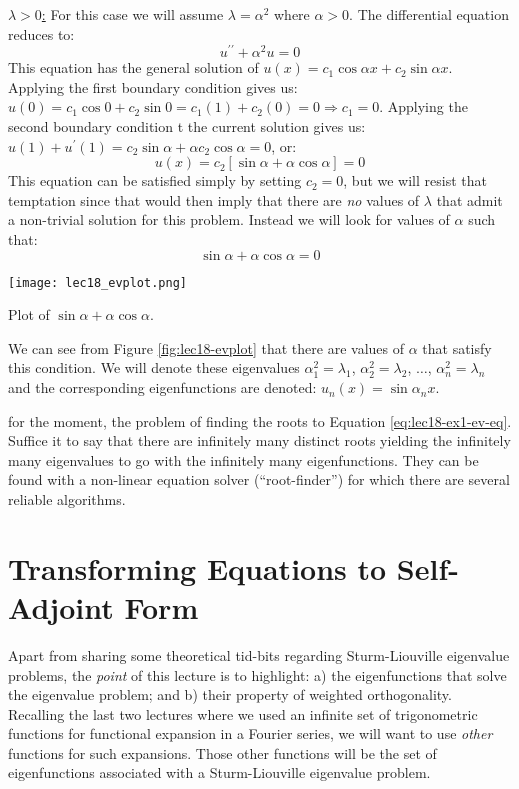 \vspace{0.5cm}

\noindent\underline{$\lambda > 0$:} For this case we will assume $\lambda = \alpha^2$ where $\alpha > 0$.  The differential equation reduces to:
\begin{equation*}
u^{\prime \prime} + \alpha^2 u = 0
\end{equation*}
This equation has the general solution of $u(x) = c_1 \cos{\alpha x} + c_2 \sin{\alpha x}$.  Applying the first boundary condition gives us: $u(0) = c_1 \cos{0} + c_2 \sin{0} = c_1(1) + c_2(0) = 0 \Rightarrow c_1 = 0$.  Applying the second boundary condition t the current solution gives us: $u(1) + u^{\prime}(1) = c_2 \sin{\alpha} + \alpha c_2 \cos{\alpha} = 0$, or:
\begin{equation}
u(x) = c_2\left[\sin{\alpha} + \alpha \cos{\alpha}\right] = 0
\label{eq:lec18-ex1}
\end{equation}
This equation can be satisfied simply by setting $c_2 = 0$, but we will resist that temptation since that would then imply that there are \emph{no} values of $\lambda$ that admit a non-trivial solution for this problem.  Instead we will look for values of $\alpha$ such that:
\begin{equation}
\sin{\alpha} + \alpha \cos{\alpha} = 0
\label{eq:lec18-ex1-ev-eq}
\end{equation}
\begin{marginfigure}
\texttt{[image: lec18\_evplot.png]}
\caption{Plot of $\sin{\alpha} + \alpha \cos{\alpha}$.}
\label{fig:lec18-evplot}
\end{marginfigure}
We can see from Figure \ref{fig:lec18-evplot} that there are values of $\alpha$ that satisfy this condition.  We will denote these eigenvalues $\alpha_1^2 = \lambda_1$, $\alpha_2^2 = \lambda_2$, $\dots$, $\alpha_n^2 = \lambda_n$ and the corresponding eigenfunctions are denoted: $u_n(x) = \sin{\alpha_n x}$.

 for the moment, the problem of finding the roots to Equation \ref{eq:lec18-ex1-ev-eq}. Suffice it to say that there are infinitely many distinct roots yielding the infinitely many eigenvalues to go with the infinitely many eigenfunctions. They can be found with a non-linear equation solver (``root-finder'') for which there are several reliable algorithms.

\section{Transforming Equations to Self-Adjoint Form}
Apart from sharing some theoretical tid-bits regarding Sturm-Liouville eigenvalue problems, the \emph{point} of this lecture is to highlight: a) the eigenfunctions that solve the eigenvalue problem; and b) their property of weighted orthogonality.  Recalling the last two lectures where we used an infinite set of trigonometric functions for functional expansion in a Fourier series, we will want to use \emph{other} functions for such expansions. Those other functions will be the set of eigenfunctions associated with a Sturm-Liouville eigenvalue problem.   

